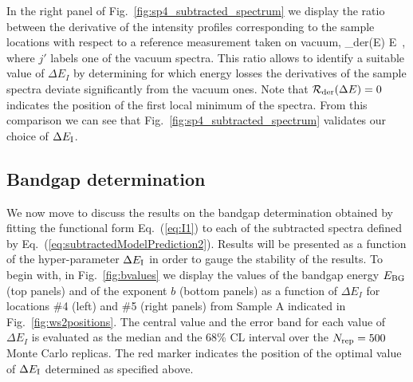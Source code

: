 {In the right panel of  Fig.~\ref{fig:sp4_subtracted_spectrum} we display the ratio
between the derivative of the intensity profiles corresponding to the sample locations
with respect to a reference measurement taken on vacuum,
\be
{}_{\rm der}(\Delta E) \equiv 
{}\lp \Delta E\rp \, ,
\ee
where $j'$ labels one of the vacuum spectra.
%
This ratio allows to identify a suitable value of $\Delta E_{I}$ by determining
for which energy losses the derivatives of the sample spectra deviate significantly
from the vacuum ones.
%
Note that $\mathcal{R}_{\rm der}(\Delta E)=0$ indicates the position of the first
local minimum of the spectra.
%
From this comparison we can see that Fig.~\ref{fig:sp4_subtracted_spectrum} validates our choice of
$\Delta E_{\rm I}$.

\subsection{Bandgap determination}

We now move to discuss the results on the bandgap determination obtained
by fitting the functional form Eq.~(\ref{eq:I1}) to each of the subtracted
spectra defined by Eq.~(\ref{eq:subtractedModelPrediction2}).
%
Results will be presented as a function of the hyper-parameter $\Delta E_{\rm I}$
in order to gauge the stability of the results.
%
To begin with, in Fig.~\ref{fig:bvalues}
we display the values of the bandgap energy $E_{\rm BG}$ (top panels)
and of the exponent $b$ (bottom panels) as a function of $\Delta E_I$
for locations \#4 (left)
and \#5 (right panels) from Sample A indicated in Fig.~\ref{fig:ws2positions}.
%
The central value and the error band for each value of $\Delta E_I$ is evaluated
as the median and the 68\% CL interval over the $N_{\rm rep}=500$ Monte Carlo replicas.
%
The red marker indicates the position of the optimal value of
$\Delta E_{\rm I}$ determined as specified above.


}
